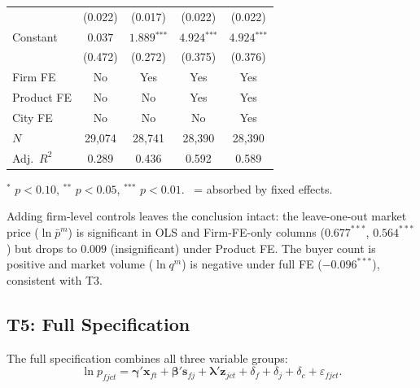 \documentclass[12pt]{article}
\newcommand{\sym}[1]{\ensuremath{^{\text{#1}}}}
\newcommand{\se}[1]{{\small(#1)}}
\newcommand{\abs}{\textemdash}
\begin{document}
\begin{landscape}
\begin{table}[H]
\begin{threeparttable}
\begin{tabular}{lcccc}
                          & \se{0.022} & \se{0.017} & \se{0.022} & \se{0.022} \\[4pt]
      Constant & \(0.037\) & \(1.889\sym{***}\) & \(4.924\sym{***}\) & \(4.924\sym{***}\) \\
               & \se{0.472} & \se{0.272} & \se{0.375} & \se{0.376} \\
      \midrule
      Firm FE    & No  & Yes & Yes & Yes \\
      Product FE & No  & No  & Yes & Yes \\
      City FE    & No  & No  & No  & Yes \\
      \(N\)      & 29,074 & 28,741 & 28,390 & 28,390 \\
      Adj.\ \(R^2\) & 0.289 & 0.436 & 0.592 & 0.589 \\
      \bottomrule
    \end{tabular}
    \begin{tablenotes}[flushleft]
      \footnotesize
      \item \sym{*} \(p<0.10\), \sym{**} \(p<0.05\), \sym{***} \(p<0.01\).
        \abs\ = absorbed by fixed effects.
      \item Adding firm-level controls leaves the conclusion intact: the
        leave-one-out market price (\(\ln\bar{p}^{m}\)) is significant in OLS
        and Firm-FE-only columns (\(0.677^{***}\), \(0.564^{***}\)) but drops to
        \(0.009\) (insignificant) under Product FE. The buyer count is positive
        and market volume (\(\ln q^{m}\)) is negative under full FE
        (\(-0.096^{***}\)), consistent with T3.
    \end{tablenotes}
  \end{threeparttable}
\end{table}
\end{landscape}

\subsection{T5: Full Specification}
\label{sec:t5}

The full specification combines all three variable groups:
\begin{equation}
  \ln p_{fjct}
  = \boldsymbol{\gamma}' \mathbf{x}_{ft}
  + \boldsymbol{\beta}' \mathbf{s}_{fj}
  + \boldsymbol{\lambda}' \mathbf{z}_{jct}
  + \delta_f + \delta_j + \delta_c
  + \varepsilon_{fjct}.
  \label{eq:t5}
\end{equation}
\end{document}
